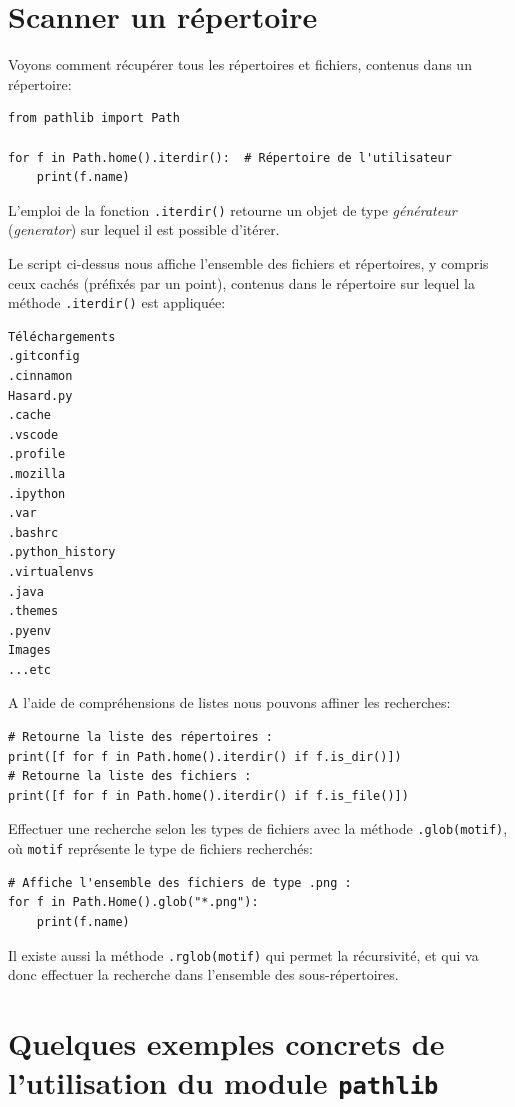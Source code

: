 \documentclass[a4paper,12pt]{book}
\begin{document}
\section{Scanner un répertoire}
Voyons comment récupérer tous les répertoires et fichiers, contenus dans un répertoire:
\begin{lstlisting}[caption=La méthode \texttt{.iterdir()}]
from pathlib import Path

for f in Path.home().iterdir():  # Répertoire de l'utilisateur
    print(f.name)
\end{lstlisting}
\medskip

L'emploi de la fonction \texttt{.iterdir()} retourne un objet de type \textit{générateur} (\textit{generator}) sur lequel il est possible d'itérer.
\medskip

Le script ci-dessus nous affiche l'ensemble des fichiers et répertoires, y compris ceux cachés (préfixés par un point), contenus dans le répertoire sur lequel la méthode \texttt{.iterdir()} est appliquée:
\begin{verbatim}
Téléchargements
.gitconfig
.cinnamon
Hasard.py
.cache
.vscode
.profile
.mozilla
.ipython
.var
.bashrc
.python_history
.virtualenvs
.java
.themes
.pyenv
Images
...etc
\end{verbatim}
\medskip

A l'aide de compréhensions de listes nous pouvons affiner les recherches:
\begin{lstlisting}[caption=La méthode \texttt{.iterdir()} avec des compréhensions de liste]
# Retourne la liste des répertoires :
print([f for f in Path.home().iterdir() if f.is_dir()])  
# Retourne la liste des fichiers :
print([f for f in Path.home().iterdir() if f.is_file()])  
\end{lstlisting}
\medskip

Effectuer une recherche selon les types de fichiers avec la méthode \texttt{.glob(motif)}, où \texttt{motif} représente le type de fichiers recherchés:
\begin{lstlisting}[caption=La méthode \texttt{.glob(motif)}]
# Affiche l'ensemble des fichiers de type .png :
for f in Path.Home().glob("*.png"):
    print(f.name)
\end{lstlisting}
\medskip

Il existe aussi la méthode \texttt{.rglob(motif)} qui permet la récursivité, et qui va donc effectuer la recherche dans l'ensemble des sous-répertoires.
\medskip

\section{Quelques exemples concrets de l'utilisation du module \texttt{pathlib}}
\end{document}

